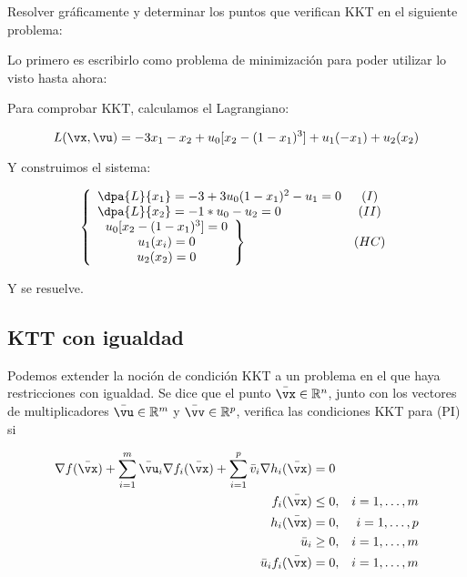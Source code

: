 \begin{example}

Resolver gráficamente y determinar los puntos que verifican KKT en el siguiente problema:

\begin{ioprob}
\end{ioprob}

Lo primero es escribirlo como problema de minimización para poder utilizar lo visto hasta ahora:

\begin{ioprob}
\end{ioprob}

Para comprobar KKT, calculamos el Lagrangiano:

\[
	L(\vx,\vu) = -3x_1 - x_2 + u_0[x_2-(1-x_1)^3] + u_1(-x_1) + u_2(x_2)
\]

Y construimos el sistema:

\[
	\left\{
	\begin{array}{lc}
		\dpa{L}{x_1} = -3 + 3u_0(1-x_1)^2 - u_1 = 0&(I)\\
		\dpa{L}{x_2} = -1 * u_0 - u_2 = 0 & (II)\\
		\left. 
			\begin{array}{c}
				u_0[x_2-(1-x_1)^3] = 0\\
				u_1(x_i) = 0\\
				u_2(x_2) = 0
			\end{array}
			\right\} &(HC)
	\end{array}
	\right.
\]

Y se resuelve.

\end{example}


\subsection{KTT con igualdad}

Podemos extender la noción de condición KKT a un problema en el que haya restricciones con igualdad.
%
Se dice que el punto $\bar{\vx}\in\mathbb{R}^n$, junto con los vectores de multiplicadores $\bar{\vu}\in\mathbb{R}^m$ y $\bar{\vv}\in\mathbb{R}^p$, verifica las condiciones KKT para (PI) si

\begin{align*}
\nabla f(\bar{\vx}) + \sum_{i=1}^m \bar{\vu}_i \nabla f_i(\bar{\vx}) + \sum_{i=1}^p \bar{v}_i\nabla h_i(\bar{\vx}) & = 0 \\
f_i(\bar{\vx}) &\leq 0, & i = 1,\ldots,m \\
h_i(\bar{\vx}) &= 0, & i = 1,\ldots,p \\
\bar{u}_i    & \geq 0, & i = 1,\ldots,m\\
\bar{u}_i f_i(\bar{\vx}) &  = 0, & i = 1,\ldots,m\\
\end{align*}


